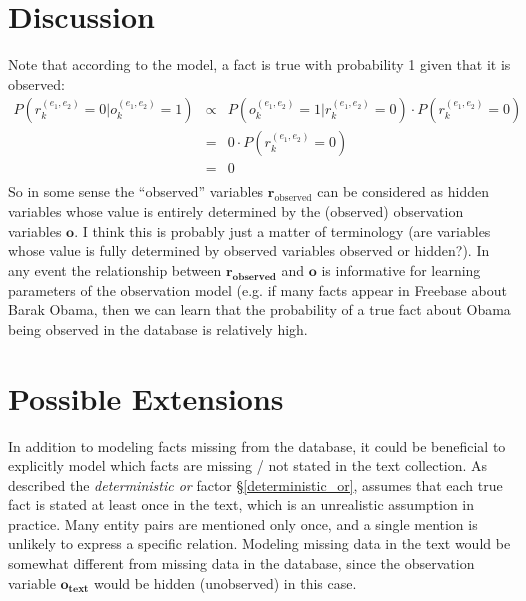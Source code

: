\documentclass[12pt]{article}
\begin{document}
\section{Discussion}
Note that according to the model, a fact is true with probability 1 given that it is observed:
\begin{eqnarray*}
P(r^{(e_1,e_2)}_k=0|o^{(e_1,e_2)}_k=1) & \propto & P(o^{(e_1,e_2)}_k=1|r^{(e_1,e_2)}_k=0) \cdot P(r^{(e_1,e_2)}_k=0) \\
& = & 0 \cdot P(r^{(e_1,e_2)}_k=0) \\
& = & 0 \\
\end{eqnarray*}
So in some sense the ``observed'' variables $\mathbf{r}_{\text{observed}}$ can be considered as hidden variables whose value is entirely determined by the (observed) observation variables $\mathbf{o}$.
I think this is probably just a matter of terminology (are variables whose value is fully determined by observed variables observed or hidden?).  In any event the relationship between
$\mathbf{r_\text{observed}}$ and $\mathbf{o}$ is informative for learning parameters of the observation model (e.g. if many facts appear in Freebase about Barak Obama, then we can learn that the probability of a
true fact about Obama being observed in the database is relatively high.

\section{Possible Extensions}
In addition to modeling facts missing from the database, it could be beneficial to explicitly model which facts are missing / not stated in the text collection.  
As described the \emph{deterministic or}
factor \S \ref{deterministic_or}, assumes that each true fact is stated at least once in the text, which is an unrealistic assumption in practice.  Many entity pairs are mentioned
only once, and a single mention is unlikely to express a specific relation.  Modeling missing data in the text would be somewhat different from missing data in the database, since
the observation variable $\mathbf{o_\text{text}}$ would be hidden (unobserved) in this case.


\end{document}
